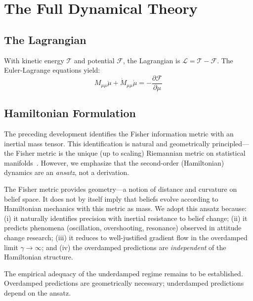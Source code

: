 \documentclass[11pt]{article}
\begin{document}
\section{The Full Dynamical Theory}
\label{sec:dynamics}

\subsection{The Lagrangian}

With kinetic energy $\mathcal{T}$ and potential $\mathcal{F}$, the Lagrangian is $\mathcal{L} = \mathcal{T} - \mathcal{F}$. The Euler-Lagrange equations yield:
\begin{equation}
M_{\mu\mu}\ddot{\mu} + \dot{M}_{\mu\mu}\dot{\mu} = -\frac{\partial\mathcal{F}}{\partial\mu}
\label{eq:euler_lagrange}
\end{equation}

\subsection{Hamiltonian Formulation}

\begin{tcolorbox}[colback=yellow!5,colframe=orange!75,title=Important Caveat: The Hamiltonian as Ansatz]
The preceding development identifies the Fisher information metric with an inertial mass tensor. This identification is natural and geometrically principled---the Fisher metric is the unique (up to scaling) Riemannian metric on statistical manifolds~\cite{Cencov1982}. However, we emphasize that the second-order (Hamiltonian) dynamics are an \emph{ansatz}, not a derivation.

The Fisher metric provides geometry---a notion of distance and curvature on belief space. It does not by itself imply that beliefs evolve according to Hamiltonian mechanics with this metric as mass. We adopt this ansatz because: (i) it naturally identifies precision with inertial resistance to belief change; (ii) it predicts phenomena (oscillation, overshooting, resonance) observed in attitude change research; (iii) it reduces to well-justified gradient flow in the overdamped limit $\gamma \to \infty$; and (iv) the overdamped predictions are \emph{independent} of the Hamiltonian structure.

The empirical adequacy of the underdamped regime remains to be established. Overdamped predictions are geometrically necessary; underdamped predictions depend on the ansatz.
\end{tcolorbox}
\end{document}
